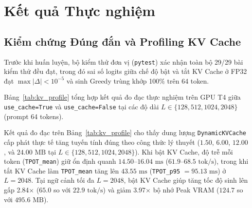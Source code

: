 \section{Kết quả Thực nghiệm}

\subsection{Kiểm chứng Đúng đắn và Profiling KV Cache}
Trước khi huấn luyện, bộ kiểm thử đơn vị (\texttt{pytest}) xác nhận toàn bộ 29/29 bài kiểm thử đều đạt, trong đó sai số logits giữa chế độ bật và tắt KV Cache ở FP32 đạt $\max |\Delta| < 10^{-5}$ và sinh Greedy trùng khớp 100\% trên 64 token.

Bảng~\ref{tab:kv_profile} tổng hợp kết quả đo đạc thực nghiệm trên GPU T4 giữa \texttt{use\_cache=True} và \texttt{use\_cache=False} tại các độ dài $L \in \{128, 512, 1024, 2048\}$ (prompt 64 tokens).

\begin{table}[htbp]
\centering
\caption{So sánh Hiệu năng Có KV Cache vs. Không KV Cache trên GPU T4}
\label{tab:kv_profile}
\end{table}

Kết quả đo đạc trên Bảng~\ref{tab:kv_profile} cho thấy dung lượng \texttt{DynamicKVCache} cấp phát thực tế tăng tuyến tính đúng theo công thức lý thuyết ($1.50$, $6.00$, $12.00$, và $24.00\text{ MB}$ tại $L \in \{128, 512, 1024, 2048\}$). Khi bật KV Cache, độ trễ mỗi token (\texttt{TPOT\_mean}) giữ ổn định quanh $14.50\text{--}16.04\text{ ms}$ ($61.9\text{--}68.5\text{ tok/s}$), trong khi tắt KV Cache làm \texttt{TPOT\_mean} tăng lên $43.55\text{ ms}$ (\texttt{TPOT\_p95} $= 95.13\text{ ms}$) ở $L=2048$. Tại ngữ cảnh tối đa $L=2048$, bật KV Cache giúp tăng tốc độ sinh lên gấp 2.84$\times$ ($65.0$ so với $22.9\text{ tok/s}$) và giảm 3.97$\times$ bộ nhớ Peak VRAM ($124.7$ so với $495.6\text{ MB}$).

